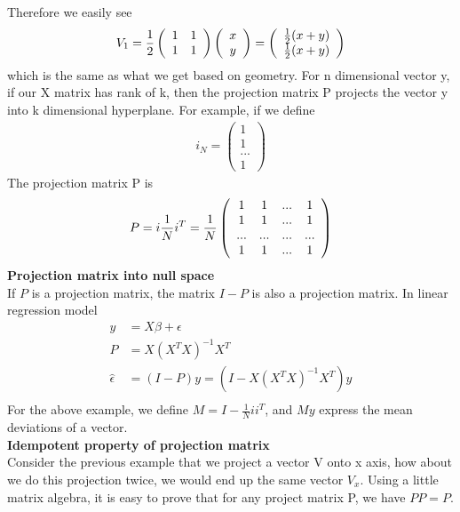 \documentclass[a4paper]{article}
\begin{document}
Therefore we easily see
\begin{align*}
V_1 =  \frac{1}{2}\left( \begin{array} { c  c } 
                   1 & 1  \\
                   1 & 1  \\
           \end{array} \right) 
             \left( \begin{array} {c }
              x \\
              y \\
            \end{array} \right)
          = \left( \begin{array} {c }
              \frac{1}{2} (x+y) \\
              \frac{1}{2} (x+y) \\
            \end{array} \right)
\end{align*}
which is the same as what we get based on geometry.
 For n dimensional vector y, if our X matrix has rank of k, then the projection matrix P projects the vector y into k dimensional hyperplane. For example, if we define
\begin{align*}
i_N =   \left( \begin{array} {c }
              1 \\
              1 \\
             ...\\
              1
            \end{array} \right)
\end{align*}
The projection matrix P is
\begin{align*}
P = i \frac{1}{N}i^T
  = \frac{1}{N} \left( \begin{array} { c  c c c } 
                   1 & 1 & ... & 1 \\
                   1 & 1 & ... & 1 \\
                   ... & ... & ... & ... \\
                   1 & 1 & ... & 1 \\
           \end{array} \right) 
\end{align*}
{\bf Projection matrix into null space}\\
If $P$ is a projection matrix, the matrix $I - P$ is also a projection matrix. In linear regression model
\begin{align*}
y &= X\beta +\epsilon\\
P &= X(X^TX)^{-1}X^T\\
\hat \epsilon & = (I - P) y = (I - X(X^TX)^{-1}X^T)y\\
\end{align*}
For the above example, we define $M = I - \frac{1}{N}i i^T$, and $My$ express the mean deviations of a vector.\\
{\bf Idempotent property of projection matrix\\}
Consider the previous example that we project a vector V onto x axis, how about we do this projection twice, we would end up the same vector $V_x$. Using a little matrix algebra, it is easy to prove that for any project matrix P, we have $PP=P$.  
\end{document}
